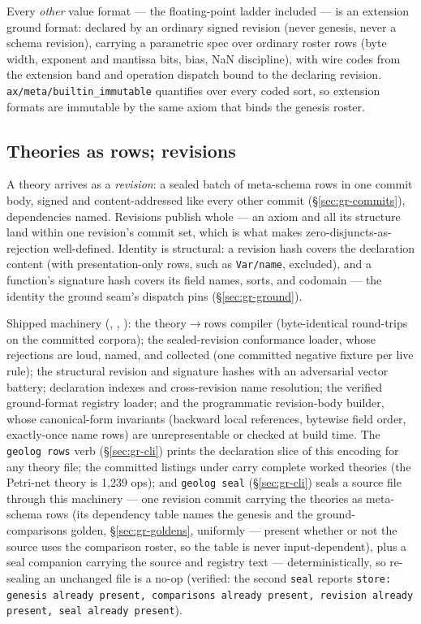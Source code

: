 \noindent Every \emph{other} value format — the floating-point ladder
included — is an extension ground format: declared by an ordinary
signed revision (never genesis, never a schema revision), carrying a
parametric spec over ordinary roster rows (byte width, exponent and
mantissa bits, bias, NaN discipline), with wire codes from the
extension band and operation dispatch bound to the declaring
revision. \texttt{ax/meta/builtin\_immutable} quantifies over every
coded sort, so extension formats are immutable by the same axiom that
binds the genesis roster.

\subsection{Theories as rows; revisions}
\label{sec:gr-meta-revisions}

A theory arrives as a \emph{revision}: a sealed batch of meta-schema
rows in one commit body, signed and content-addressed like every
other commit (\S\ref{sec:gr-commits}), dependencies named. Revisions
publish whole — an axiom and all its structure land within one
revision's commit set, which is what makes zero-disjuncts-as-rejection
well-defined. Identity is structural: a revision hash covers the
declaration content (with presentation-only rows, such as
\texttt{Var/name}, excluded), and a function's signature hash covers
its field names, sorts, and codomain — the identity the ground
seam's dispatch pins (\S\ref{sec:gr-ground}).

Shipped machinery (,
, ): the
theory$\to$rows compiler (byte-identical round-trips on the committed
corpora); the sealed-revision conformance loader, whose rejections
are loud, named, and collected (one committed negative fixture per
live rule); the structural revision and signature hashes with an
adversarial vector battery; declaration indexes and cross-revision
name resolution; the verified ground-format registry loader; and the
programmatic revision-body builder, whose canonical-form invariants
(backward local references, bytewise field order, exactly-once name
rows) are unrepresentable or checked at build time. The
\texttt{geolog rows} verb (\S\ref{sec:gr-cli}) prints the declaration
slice of this encoding for any theory file; the committed listings
under  carry complete worked theories
(the Petri-net theory is 1{,}239 ops); and \texttt{geolog seal}
(\S\ref{sec:gr-cli}) seals a source file through this machinery —
one revision commit carrying the theories as meta-schema rows (its
dependency table names the genesis and the ground-comparisons
golden, \S\ref{sec:gr-goldens}, uniformly — present whether or not
the source uses the comparison roster, so the table is never
input-dependent), plus a seal companion carrying the source and
registry text — deterministically, so re-sealing an unchanged file
is a no-op (verified: the second \texttt{seal} reports
\texttt{store: genesis already present, comparisons already present,
revision already present, seal already present}).

